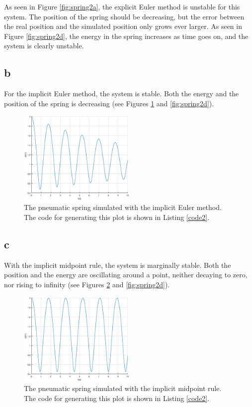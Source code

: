 \documentclass{article}
\begin{document}
As seen in Figure \ref{fig:spring2a}, the explicit Euler method is unstable for this system. The position of the spring should be decreasing, but the error between the real position and the simulated position only grows ever larger. As seen in Figure \ref{fig:spring2d}, the energy in the spring increases as time goes on, and the system is clearly unstable.

\subsection{b}

For the implicit Euler method, the system is stable. Both the energy and the position of the spring is decreasing (see Figures \ref{fig:spring2b} and \ref{fig:spring2d}).

\begin{figure}[!ht]\label{fig:spring2b}
	\centering
	\includegraphics[width = 0.5\textwidth]{ModSim_ex4_2b}
    \caption{The pneumatic spring simulated with the implicit Euler method. The code for generating this plot is shown in Listing \ref{code2}.}
\end{figure}

\subsection{c}

With the implicit midpoint rule, the system is marginally stable. Both the position and the energy are oscillating around a point, neither decaying to zero, nor rising to infinity (see Figures \ref{fig:spring2c} and \ref{fig:spring2d}). 

\begin{figure}[!ht]\label{fig:spring2c}
	\centering
	\includegraphics[width = 0.5\textwidth]{ModSim_ex4_2c}
    \caption{The pneumatic spring simulated with the implicit midpoint rule. The code for generating this plot is shown in Listing \ref{code2}.}
\end{figure}
\end{document}
